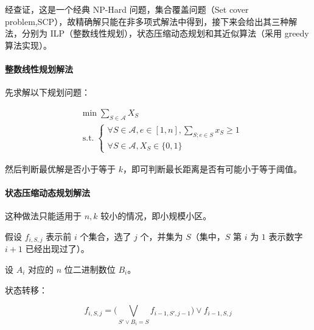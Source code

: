 \documentclass{cumcmthesis}
\begin{document}
经查证，这是一个经典 NP-Hard 问题，集合覆盖问题（Set cover problem,SCP），故精确解只能在非多项式解法中得到，接下来会给出其三种解法，分别为 ILP（整数线性规划），状态压缩动态规划和其近似算法（采用 greedy 算法实现）。

\paragraph{整数线性规划解法}

先求解以下规划问题：

\begin{align*}
    &\min\sum\limits_{S \in \mathscr{A}} X_S\\
    &\operatorname{s.t.}\begin{cases}
        \forall S \in \mathscr{A}, e \in [1,n],\sum_{S;e \in S} x_S \ge 1\\
        \forall S \in \mathscr{A}, X_S \in \{0,1\}
    \end{cases}
\end{align*}

然后判断最优解是否小于等于 $k$，即可判断最长距离是否有可能小于等于阈值。




\paragraph{状态压缩动态规划解法}

这种做法只能适用于 $n,k$ 较小的情况，即小规模小区。

假设 $f_{i,S,j}$ 表示前 $i$ 个集合，选了 $j$ 个，并集为 $S$（集中，$S$ 第 $i$ 为 $1$ 表示数字 $i+1$ 已经出现过了）。

设 $A_i$ 对应的 $n$ 位二进制数位 $B_i$。

状态转移：

\begin{equation*}
    f_{i,S,j} = \Big ( \bigvee_{S'\vee B_i = S}{f_{i-1,S',j-1}} \Big ) \vee f_{i-1,S,j}
\end{equation*}
\end{document}
